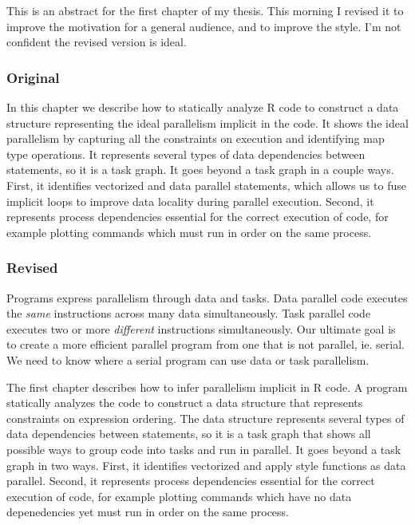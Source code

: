 \documentclass[11pt]{article}
\begin{document}
This is an abstract for the first chapter of my thesis. This morning I
revised it to improve the motivation for a general audience, and to improve
the style. I'm not confident the revised version is ideal.

\subsubsection{Original}

In this chapter we describe how to statically analyze R code to construct a
data structure representing the ideal parallelism implicit in the code. It
shows the ideal parallelism by capturing all the constraints on execution
and identifying map type operations. It represents several types of data
dependencies between statements, so it is a task graph. It goes beyond a
task graph in a couple ways. First, it identifies vectorized and data
parallel statements, which allows us to fuse implicit loops to improve data
locality during parallel execution. Second, it represents process
dependencies essential for the correct execution of code, for example
plotting commands which must run in order on the same process.

\subsubsection{Revised}

Programs express parallelism through data and tasks. Data parallel code
executes the \emph{same} instructions across many data simultaneously. Task
parallel code executes two or more \emph{different} instructions
simultaneously. Our ultimate goal is to create a more efficient parallel
program from one that is not parallel, ie. serial. We need to know where a
serial program can use data or task parallelism.

The first chapter describes how to infer parallelism implicit in R code. A
program statically analyzes the code to construct a data structure that
represents constraints on expression ordering. The data structure
represents several types of data dependencies between statements, so it is
a task graph that shows all possible ways to group code into tasks and run
in parallel. It goes beyond a task graph in two ways. First, it identifies
vectorized and apply style functions as data parallel. Second, it
represents process dependencies essential for the correct execution of
code, for example plotting commands which have no data depenedencies yet
must run in order on the same process.
\end{document}
